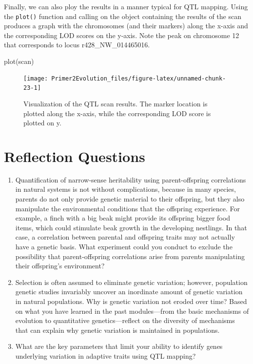 \documentclass[
]{book}
\newenvironment{Shaded}{\begin{snugshade}}{\end{snugshade}}
\newcommand{\FunctionTok}[1]{\textcolor[rgb]{0.00,0.00,0.00}{#1}}
\newcommand{\NormalTok}[1]{#1}
\begin{document}
Finally, we can also ploy the results in a manner typical for QTL mapping. Using the \texttt{plot()} function and calling on the object containing the results of the scan produces a graph with the chromosomes (and their markers) along the x-axis and the corresponding LOD scores on the y-axis. Note the peak on chromosome 12 that corresponds to locus r428\_NW\_014465016.

\begin{Shaded}
\begin{Highlighting}[]
\FunctionTok{plot}\NormalTok{(scan)}
\end{Highlighting}
\end{Shaded}

\begin{figure}
\texttt{[image: Primer2Evolution\_files/figure-latex/unnamed-chunk-23-1]} \caption{Visualization of the QTL scan results. The marker location is plotted along the x-axis, while the corresponding LOD score is plotted on y.}\label{fig:unnamed-chunk-23}
\end{figure}

\hypertarget{reflection-questions-7}{%
\section{Reflection Questions}\label{reflection-questions-7}}

\begin{enumerate}
\def\labelenumi{\arabic{enumi}.}
\item
  Quantification of narrow-sense heritability using parent-offspring correlations in natural systems is not without complications, because in many species, parents do not only provide genetic material to their offspring, but they also manipulate the environmental conditions that the offspring experience. For example, a finch with a big beak might provide its offspring bigger food items, which could stimulate beak growth in the developing nestlings. In that case, a correlation between parental and offspring traits may not actually have a genetic basis. What experiment could you conduct to exclude the possibility that parent-offspring correlations arise from parents manipulating their offspring's environment?
\item
  Selection is often assumed to eliminate genetic variation; however, population genetic studies invariably uncover an inordinate amount of genetic variation in natural populations. Why is genetic variation not eroded over time? Based on what you have learned in the past modules---from the basic mechanisms of evolution to quantitative genetics---reflect on the diversity of mechanisms that can explain why genetic variation is maintained in populations.
\item
  What are the key parameters that limit your ability to identify genes underlying variation in adaptive traits using QTL mapping?
\end{enumerate}
\end{document}
